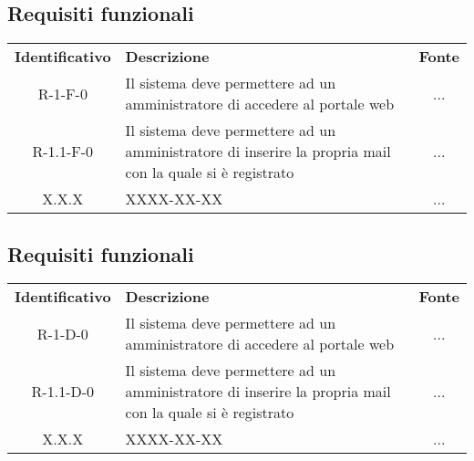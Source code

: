 \subsection{Requisiti funzionali}
\renewcommand{\arraystretch}{1.5}
\begin{longtable}{ c C{9cm} c }
    \rowcolor{\primaryColor}
    \textcolor{\secondaryColor}{
    \textbf{Identificativo}} & \textcolor{\secondaryColor}{\textbf{Descrizione}}                                                            & \textcolor{\secondaryColor}
    {\textbf{Fonte}}                                                                                                                                                      \\

    R-1-F-0                  & Il sistema deve permettere ad un amministratore di accedere al portale web                                   & ...                         \\
    R-1.1-F-0                  & Il sistema deve permettere ad un amministratore di inserire la propria mail con la quale si \`{e} registrato & ...                         \\
    X.X.X                    & XXXX-XX-XX                                                                                                   & ...                         \\
\end{longtable}




\subsection{Requisiti funzionali}
\renewcommand{\arraystretch}{1.5}
\begin{longtable}{ c C{9cm} c }
    \rowcolor{\primaryColor}
    \textcolor{\secondaryColor}{
    \textbf{Identificativo}} & \textcolor{\secondaryColor}{\textbf{Descrizione}}                                                            & \textcolor{\secondaryColor}
    {\textbf{Fonte}}                                                                                                                                                      \\

    R-1-D-0                  & Il sistema deve permettere ad un amministratore di accedere al portale web                                   & ...                         \\
    R-1.1-D-0                  & Il sistema deve permettere ad un amministratore di inserire la propria mail con la quale si \`{e} registrato & ...                         \\
    X.X.X                    & XXXX-XX-XX                                                                                                   & ...                         \\
\end{longtable}
